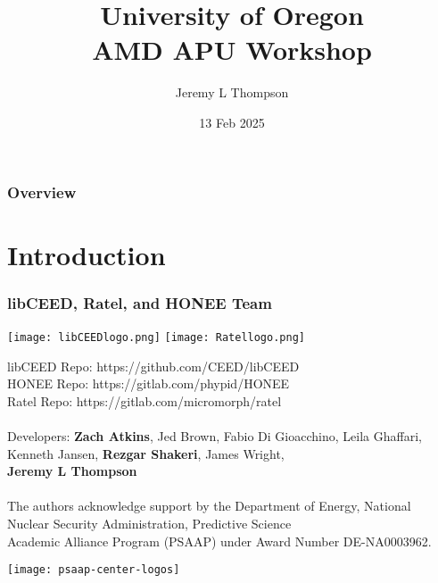 \documentclass{beamer}
\title[UO AMD APU Workshop]{University of Oregon\\AMD APU Workshop
} %
\author{Jeremy L Thompson} %
\institute[CU Boulder] %
{University of Colorado Boulder \\ %
\medskip
\textit{jeremy@jeremylt.org} %
}
\date{13 Feb 2025} %
\begin{document}
\begin{frame}
\titlepage %
\end{frame}


\begin{frame}
\frametitle{Overview} %
\tableofcontents %
\end{frame}

\section{Introduction}

\begin{frame}
\frametitle{libCEED, Ratel, and HONEE Team}

\begin{center}
\texttt{[image: libCEEDlogo.png]}
\texttt{[image: Ratellogo.png]}
\end{center}

{\flushleft

libCEED Repo: https://github.com/CEED/libCEED\\
HONEE Repo: https://gitlab.com/phypid/HONEE\\
Ratel Repo: https://gitlab.com/micromorph/ratel\\

~\\
Developers: \textbf{Zach Atkins}, Jed Brown, Fabio Di Gioacchino, Leila Ghaffari,\\
\hspace{19mm} Kenneth Jansen, \textbf{Rezgar Shakeri}, James Wright,\\
\hspace{19mm} \textbf{Jeremy L Thompson}\\

~\\

{\tiny The authors acknowledge support by the Department of Energy, National Nuclear Security Administration, Predictive Science\\Academic Alliance Program (PSAAP) under Award Number DE-NA0003962.}

}

\begin{center}
\texttt{[image: psaap-center-logos]}
\end{center}

\end{frame}
\end{document}
